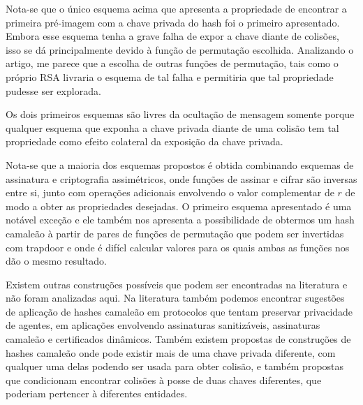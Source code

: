 \documentclass[a4paper]{article}
\begin{document}
Nota-se que o único esquema acima que apresenta a propriedade de
encontrar a primeira pré-imagem com a chave privada do hash foi o
primeiro apresentado. Embora esse esquema tenha a grave falha de expor
a chave diante de colisões, isso se dá principalmente devido à função
de permutação escolhida. Analizando o artigo, me parece que a escolha
de outras funções de permutação, tais como o próprio RSA livraria o
esquema de tal falha e permitiria que tal propriedade pudesse ser
explorada.

Os dois primeiros esquemas são livres da ocultação de mensagem somente
porque qualquer esquema que exponha a chave privada diante de uma
colisão tem tal propriedade como efeito colateral da exposição da
chave privada.

Nota-se que a maioria dos esquemas propostos é obtida combinando
esquemas de assinatura e criptografia assimétricos, onde funções de
assinar e cifrar são inversas entre si, junto com operações adicionais
envolvendo o valor complementar de $r$ de modo a obter as propriedades
desejadas. O primeiro esquema apresentado é uma notável exceção e ele
também nos apresenta a possibilidade de obtermos um hash camaleão à
partir de pares de funções de permutação que podem ser invertidas com
trapdoor e onde é difícl calcular valores para os quais ambas as
funções nos dão o mesmo resultado.

Existem outras construções possíveis que podem ser encontradas na
literatura e não foram analizadas aqui. Na literatura também podemos
encontrar sugestões de aplicação de hashes camaleão em protocolos que
tentam preservar privacidade de agentes, em aplicações envolvendo
assinaturas sanitizáveis, assinaturas camaleão e certificados
dinâmicos. Também existem propostas de construções de hashes camaleão
onde pode existir mais de uma chave privada diferente, com qualquer
uma delas podendo ser usada para obter colisão, e também propostas que
condicionam encontrar colisões à posse de duas chaves diferentes, que
poderiam pertencer à diferentes entidades.

{}
\end{document}
